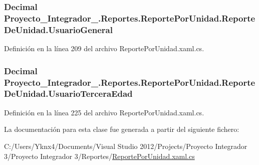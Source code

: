 \hypertarget{class_proyecto___integrador__3_1_1_reportes_1_1_reporte_por_unidad_1_1_reporte_de_unidad_a4f6bbb5f64597b687fc92b97b6080b7a}{
\subsubsection[{Usuario\-General}]{\setlength{\rightskip}{0pt plus 5cm}Decimal Proyecto\-\_\-\-Integrador\-\_.\-Reportes.\-Reporte\-Por\-Unidad.\-Reporte\-De\-Unidad.\-Usuario\-General\hspace{0.3cm}{\ttfamily [get]}}}\label{class_proyecto___integrador__3_1_1_reportes_1_1_reporte_por_unidad_1_1_reporte_de_unidad_a4f6bbb5f64597b687fc92b97b6080b7a}


Definición en la línea 209 del archivo Reporte\-Por\-Unidad.\-xaml.\-cs.

\hypertarget{class_proyecto___integrador__3_1_1_reportes_1_1_reporte_por_unidad_1_1_reporte_de_unidad_a059c79268e28b401f6792a4990807e25}{
\subsubsection[{Usuario\-Tercera\-Edad}]{\setlength{\rightskip}{0pt plus 5cm}Decimal Proyecto\-\_\-\-Integrador\-\_.\-Reportes.\-Reporte\-Por\-Unidad.\-Reporte\-De\-Unidad.\-Usuario\-Tercera\-Edad\hspace{0.3cm}{\ttfamily [get]}}}\label{class_proyecto___integrador__3_1_1_reportes_1_1_reporte_por_unidad_1_1_reporte_de_unidad_a059c79268e28b401f6792a4990807e25}


Definición en la línea 225 del archivo Reporte\-Por\-Unidad.\-xaml.\-cs.



La documentación para esta clase fue generada a partir del siguiente fichero\-:\begin{DoxyCompactItemize}
\item 
C\-:/\-Users/\-Yknx4/\-Documents/\-Visual Studio 2012/\-Projects/\-Proyecto Integrador 3/\-Proyecto Integrador 3/\-Reportes/\hyperlink{_reporte_por_unidad_8xaml_8cs}{Reporte\-Por\-Unidad.\-xaml.\-cs}\end{DoxyCompactItemize}
